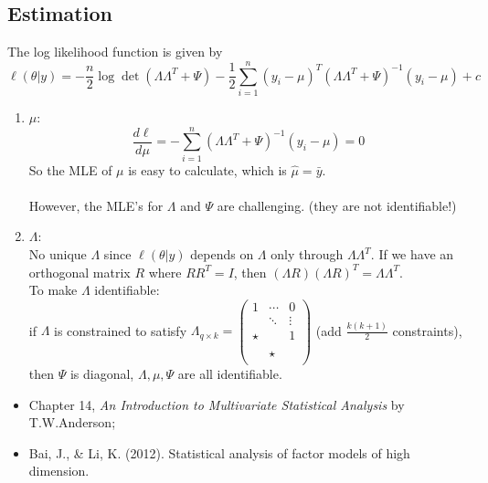 \documentclass[12pt]{book}
\theoremstyle{definition}
\theoremstyle{remark}
\begin{document}
\subsection{Estimation}
The log likelihood function is given by
\[\ell(\theta|y) = -\frac{n}{2}\log\det(\Lambda\Lambda^T+\Psi)-\frac{1}{2}\sum_{i=1}^n(y_i - \mu)^T(\Lambda\Lambda^T+\Psi)^{-1}(y_i - \mu)+c\]

\begin{enumerate}
    \item $\mu$:\\
    \[\frac{d \ell}{d \mu} = -\sum_{i=1}^n (\Lambda\Lambda^T+\Psi)^{-1}(y_i - \mu) = 0\]
    So the MLE of $\mu$ is easy to calculate, which is $\hat{\mu} = \bar{y}$.\\
    \\
    However, the MLE's for $\Lambda$ and $\Psi$ are challenging. (they are not identifiable!)
    \item $\Lambda$:\\
    No unique $\Lambda$ since $\ell(\theta|y)$ depends on $\Lambda$ only through $\Lambda\Lambda^T$. If we have an orthogonal matrix $R$ where $RR^T = I$, then $(\Lambda R)(\Lambda R)^T = \Lambda\Lambda^T$.\\

    To make $\Lambda$ identifiable:\\
    if $\Lambda$ is constrained to satisfy $\Lambda_{q\times k} = \begin{pmatrix}
 1 &  \cdots&0\\
 & \ddots & \vdots\\
 \star &  & 1\\
  &  & \\
  & \star &\\
  &  &
\end{pmatrix}$ (add $\frac{k(k+1)}{2}$ constraints), then $\Psi$ is diagonal, $\Lambda, \mu, \Psi$ are all identifiable.
\end{enumerate}


\begin{referencebox}
    \begin{itemize}
        \item Chapter 14, \textit{An Introduction to Multivariate Statistical Analysis} by T.W.Anderson;
        \item Bai, J., \& Li, K. (2012). Statistical analysis of factor models of high dimension.
    \end{itemize}
\end{referencebox}
\end{document}
